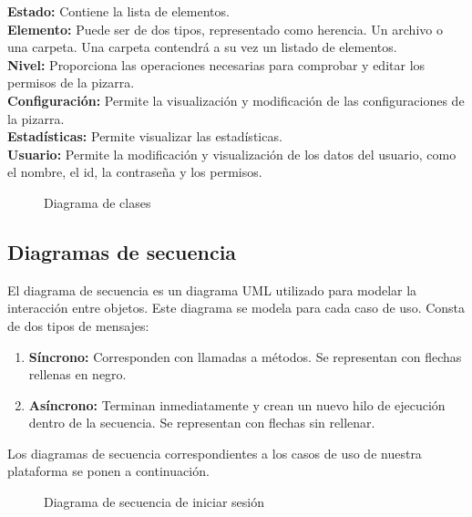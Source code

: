 \textbf{Estado:} Contiene la lista de elementos.\\

\textbf{Elemento:} Puede ser de dos tipos, representado como herencia. Un archivo o una carpeta. Una carpeta contendrá a su vez un listado de elementos.\\

\textbf{Nivel: }Proporciona las operaciones necesarias para comprobar y editar los permisos de la pizarra.\\

\textbf{Configuración: }Permite la visualización y modificación de las configuraciones de la pizarra.\\

\textbf{Estadísticas: }Permite visualizar las estadísticas.\\

\textbf{Usuario:} Permite la modificación y visualización de los datos del usuario, como el nombre, el id, la contraseña y los permisos.


\begin{sidewaysfigure}
\centering
\clases
\caption{Diagrama de clases}
\end{sidewaysfigure}


\subsection{Diagramas de secuencia}

El diagrama de secuencia es un diagrama UML utilizado para modelar la interacción entre objetos. Este diagrama se modela para cada caso de uso. Consta de dos tipos de mensajes:
\begin{enumerate}
	\item \textbf{Síncrono: }Corresponden con llamadas a métodos. Se representan con flechas rellenas en negro.
	\item \textbf{Asíncrono: }Terminan inmediatamente y crean un nuevo hilo de ejecución dentro de la secuencia. Se representan con flechas sin rellenar.
\end{enumerate}

Los diagramas de secuencia correspondientes a los casos de uso de nuestra plataforma se ponen a continuación.

\begin{figure}[!h]
\centering
\seqIniciarSesion
\caption{Diagrama de secuencia de iniciar sesión}
\end{figure}